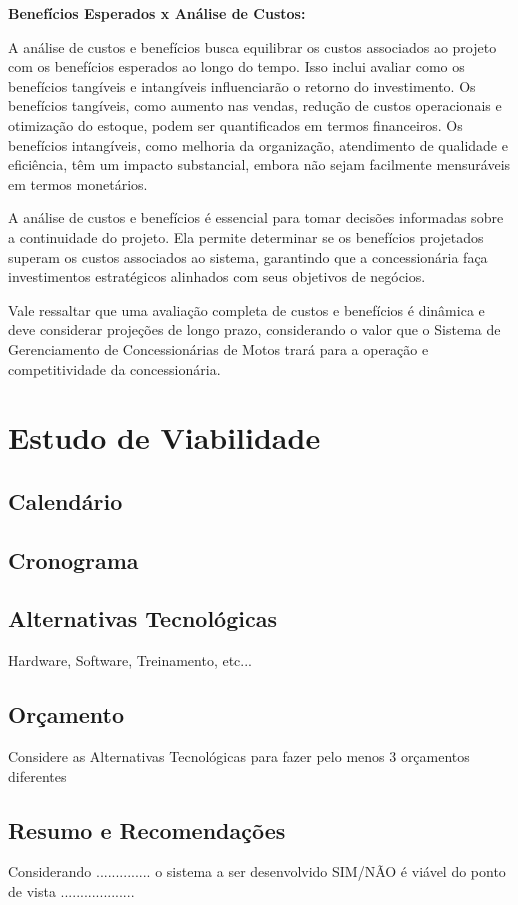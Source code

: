 \textbf{Benefícios Esperados x Análise de Custos:}

A análise de custos e benefícios busca equilibrar os custos associados ao projeto com os benefícios esperados ao longo do tempo. Isso inclui avaliar como os benefícios tangíveis e intangíveis influenciarão o retorno do investimento. Os benefícios tangíveis, como aumento nas vendas, redução de custos operacionais e otimização do estoque, podem ser quantificados em termos financeiros. Os benefícios intangíveis, como melhoria da organização, atendimento de qualidade e eficiência, têm um impacto substancial, embora não sejam facilmente mensuráveis em termos monetários.

A análise de custos e benefícios é essencial para tomar decisões informadas sobre a continuidade do projeto. Ela permite determinar se os benefícios projetados superam os custos associados ao sistema, garantindo que a concessionária faça investimentos estratégicos alinhados com seus objetivos de negócios.

Vale ressaltar que uma avaliação completa de custos e benefícios é dinâmica e deve considerar projeções de longo prazo, considerando o valor que o Sistema de Gerenciamento de Concessionárias de Motos trará para a operação e competitividade da concessionária.

\section{Estudo de Viabilidade}


       \subsection{Calend\'{a}rio }

       \subsection{Cronograma }

       \subsection{Alternativas Tecnol\'{o}gicas }
        Hardware, Software, Treinamento, etc...

       \subsection{Or\c{c}amento }
       Considere as Alternativas Tecnol\'{o}gicas para fazer pelo menos 3 or\c{c}amentos diferentes



       \subsection{Resumo e Recomenda\c{c}\~{o}es}

       Considerando .............. o sistema a ser desenvolvido SIM/N\~{A}O \'{e} vi\'{a}vel do ponto de vista ...................
